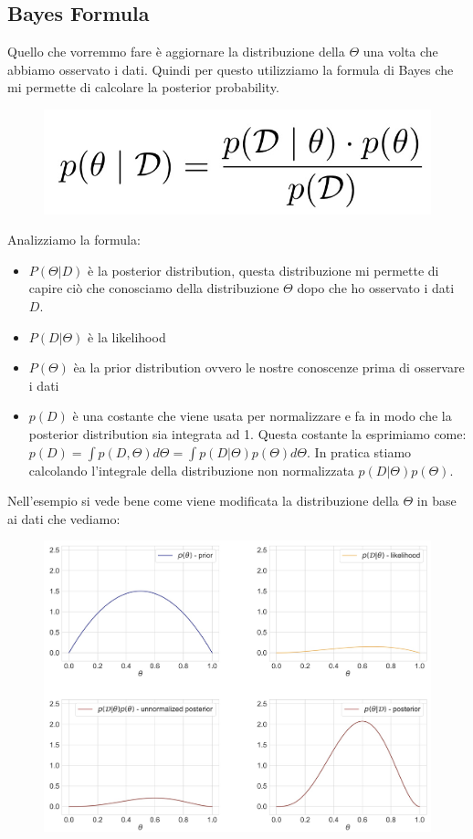 \documentclass[14pt]{extreport}
\begin{document}
\subsection{Bayes Formula}

Quello che vorremmo fare è aggiornare la distribuzione della $\Theta$ una volta che abbiamo osservato i dati. Quindi per questo utilizziamo la formula
di Bayes che mi permette di calcolare la posterior probability.

\begin{figure}[H]
\centering
\includegraphics[width=0.4\linewidth]{30.jpeg}
\end{figure}

Analizziamo la formula:
\begin{itemize}
\item $P(\Theta | D)$ è la posterior distribution, questa distribuzione mi permette di capire ciò che conosciamo della distribuzione $\Theta$ dopo che
ho osservato i dati $D$.
\item $P(D|\Theta)$ è la likelihood
\item $P(\Theta)$ èa la prior distribution ovvero le nostre conoscenze prima di osservare i dati
\item $p(D)$ è una costante che viene usata per normalizzare e fa in modo che la posterior distribution sia integrata ad 1. Questa costante la
esprimiamo come: $p(D) = \int p(D,\Theta) d\Theta = \int p(D|\Theta) p(\Theta) d\Theta$. In pratica stiamo calcolando l'integrale della distribuzione
non normalizzata $p(D|\Theta) p(\Theta)$.
\end{itemize}

Nell'esempio si vede bene come viene modificata la distribuzione della $\Theta$ in base ai dati che vediamo:

\begin{figure}[H]
\centering
\includegraphics[width=0.7\linewidth]{31.jpeg}
\end{figure}
\end{document}
